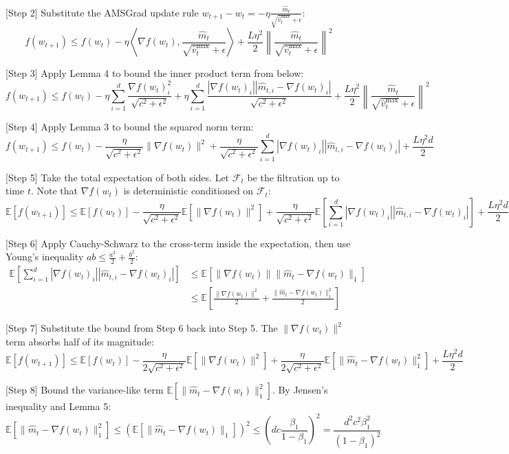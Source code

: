 \documentclass{article}
\begin{document}
[Step 2] Substitute the AMSGrad update rule $w_{t+1} - w_t = -\eta \frac{\hat{m}_t}{\sqrt{\hat{v}_t^{\max}} + \epsilon}$:
$$ f(w_{t+1}) \leq f(w_t) - \eta \left\langle \nabla f(w_t), \frac{\hat{m}_t}{\sqrt{\hat{v}_t^{\max}} + \epsilon} \right\rangle + \frac{L \eta^2}{2} \left\| \frac{\hat{m}_t}{\sqrt{\hat{v}_t^{\max}} + \epsilon} \right\|^2 $$

[Step 3] Apply Lemma 4 to bound the inner product term from below:
$$ f(w_{t+1}) \leq f(w_t) - \eta \sum_{i=1}^d \frac{\nabla f(w_t)_i^2}{\sqrt{c^2+\epsilon^2}} + \eta \sum_{i=1}^d \frac{|\nabla f(w_t)_i| |\hat{m}_{t,i} - \nabla f(w_t)_i|}{\sqrt{c^2+\epsilon^2}} + \frac{L \eta^2}{2} \left\| \frac{\hat{m}_t}{\sqrt{\hat{v}_t^{\max}} + \epsilon} \right\|^2 $$

[Step 4] Apply Lemma 3 to bound the squared norm term:
$$ f(w_{t+1}) \leq f(w_t) - \frac{\eta}{\sqrt{c^2+\epsilon^2}} \|\nabla f(w_t)\|^2 + \frac{\eta}{\sqrt{c^2+\epsilon^2}} \sum_{i=1}^d |\nabla f(w_t)_i| |\hat{m}_{t,i} - \nabla f(w_t)_i| + \frac{L \eta^2 d}{2} $$

[Step 5] Take the total expectation of both sides. Let $\mathcal{F}_t$ be the filtration up to time $t$. Note that $\nabla f(w_t)$ is deterministic conditioned on $\mathcal{F}_t$:
$$ \mathbb{E}[f(w_{t+1})] \leq \mathbb{E}[f(w_t)] - \frac{\eta}{\sqrt{c^2+\epsilon^2}} \mathbb{E}[\|\nabla f(w_t)\|^2] + \frac{\eta}{\sqrt{c^2+\epsilon^2}} \mathbb{E}\left[ \sum_{i=1}^d |\nabla f(w_t)_i| |\hat{m}_{t,i} - \nabla f(w_t)_i| \right] + \frac{L \eta^2 d}{2} $$

[Step 6] Apply Cauchy-Schwarz to the cross-term inside the expectation, then use Young's inequality $ab \leq \frac{a^2}{2} + \frac{b^2}{2}$:
\begin{align*}
\mathbb{E}\left[ \sum_{i=1}^d |\nabla f(w_t)_i| |\hat{m}_{t,i} - \nabla f(w_t)_i| \right] &\leq \mathbb{E}\left[ \|\nabla f(w_t)\| \|\hat{m}_t - \nabla f(w_t)\|_1 \right] \\
&\leq \mathbb{E}\left[ \frac{\|\nabla f(w_t)\|^2}{2} + \frac{\|\hat{m}_t - \nabla f(w_t)\|_1^2}{2} \right]
\end{align*}

[Step 7] Substitute the bound from Step 6 back into Step 5. The $\|\nabla f(w_t)\|^2$ term absorbs half of its magnitude:
$$ \mathbb{E}[f(w_{t+1})] \leq \mathbb{E}[f(w_t)] - \frac{\eta}{2\sqrt{c^2+\epsilon^2}} \mathbb{E}[\|\nabla f(w_t)\|^2] + \frac{\eta}{2\sqrt{c^2+\epsilon^2}} \mathbb{E}[\|\hat{m}_t - \nabla f(w_t)\|_1^2] + \frac{L \eta^2 d}{2} $$

[Step 8] Bound the variance-like term $\mathbb{E}[\|\hat{m}_t - \nabla f(w_t)\|_1^2]$. By Jensen's inequality and Lemma 5:
$$ \mathbb{E}[\|\hat{m}_t - \nabla f(w_t)\|_1^2] \leq \left( \mathbb{E}[\|\hat{m}_t - \nabla f(w_t)\|_1] \right)^2 \leq \left( d c \frac{\beta_1}{1-\beta_1} \right)^2 = \frac{d^2 c^2 \beta_1^2}{(1-\beta_1)^2} $$
\end{document}
